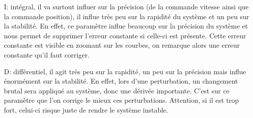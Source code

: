 \documentclass[a4paper]{article}
\begin{document}
	I: intégral, il va surtout influer sur la précision (de la commande vitesse ainsi que la commande position), il influe très peu sur la rapidité du système et un peu sur la stabilité. En effet, ce paramètre influe beaucoup sur la précision du système et nous permet de supprimer l'erreur constante si celle-ci est présente. Cette erreur constante est visible en zoomant sur les courbes, on remarque alors une erreur constante qu'il faut corriger.
	
	D: différentiel, il agit très peu sur la rapidité, un peu sur la précision mais influe énormément sur la stabilité. En effet, lors d'une perturbation, un changement brutal sera appliqué au système, donc une dérivée importante. C'est sur ce paramètre que l'on corrige le mieux ces perturbations.
	Attention, si il est trop fort, celui-ci risque juste de rendre le système instable.
	
\end{document}

